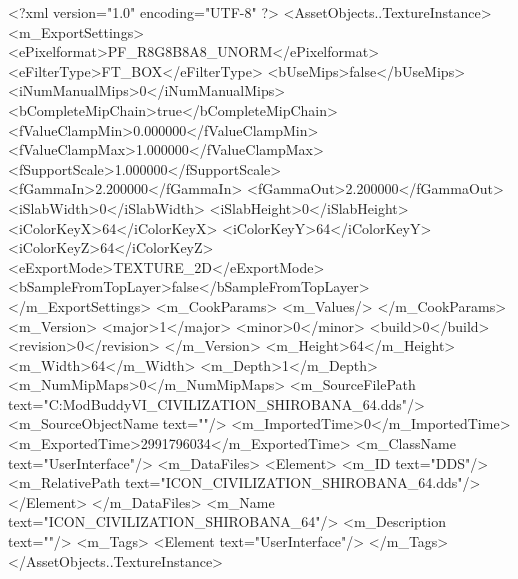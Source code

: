<?xml version="1.0" encoding="UTF-8" ?>
<AssetObjects..TextureInstance>
	<m_ExportSettings>
		<ePixelformat>PF_R8G8B8A8_UNORM</ePixelformat>
		<eFilterType>FT_BOX</eFilterType>
		<bUseMips>false</bUseMips>
		<iNumManualMips>0</iNumManualMips>
		<bCompleteMipChain>true</bCompleteMipChain>
		<fValueClampMin>0.000000</fValueClampMin>
		<fValueClampMax>1.000000</fValueClampMax>
		<fSupportScale>1.000000</fSupportScale>
		<fGammaIn>2.200000</fGammaIn>
		<fGammaOut>2.200000</fGammaOut>
		<iSlabWidth>0</iSlabWidth>
		<iSlabHeight>0</iSlabHeight>
		<iColorKeyX>64</iColorKeyX>
		<iColorKeyY>64</iColorKeyY>
		<iColorKeyZ>64</iColorKeyZ>
		<eExportMode>TEXTURE_2D</eExportMode>
		<bSampleFromTopLayer>false</bSampleFromTopLayer>
	</m_ExportSettings>
	<m_CookParams>
		<m_Values/>
	</m_CookParams>
	<m_Version>
		<major>1</major>
		<minor>0</minor>
		<build>0</build>
		<revision>0</revision>
	</m_Version>
	<m_Height>64</m_Height>
	<m_Width>64</m_Width>
	<m_Depth>1</m_Depth>
	<m_NumMipMaps>0</m_NumMipMaps>
	<m_SourceFilePath text="C:\Users\asus\Documents\Firaxis ModBuddy\Civilization VI\temppic\ICON_CIVILIZATION_SHIROBANA_64.dds"/>
	<m_SourceObjectName text=""/>
	<m_ImportedTime>0</m_ImportedTime>
	<m_ExportedTime>2991796034</m_ExportedTime>
	<m_ClassName text="UserInterface"/>
	<m_DataFiles>
		<Element>
			<m_ID text="DDS"/>
			<m_RelativePath text="ICON_CIVILIZATION_SHIROBANA_64.dds"/>
		</Element>
	</m_DataFiles>
	<m_Name text="ICON_CIVILIZATION_SHIROBANA_64"/>
	<m_Description text=""/>
	<m_Tags>
		<Element text="UserInterface"/>
	</m_Tags>
</AssetObjects..TextureInstance>

